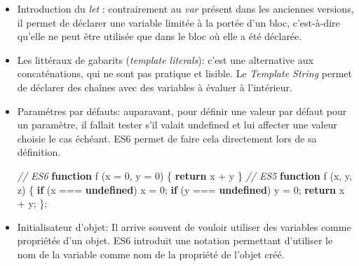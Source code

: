 \documentclass[12pt,a4paper]{article}
\newenvironment{Shaded}{}{}
\newcommand{\KeywordTok}[1]{\textcolor[rgb]{0.00,0.44,0.13}{\textbf{{#1}}}}
\newcommand{\DecValTok}[1]{\textcolor[rgb]{0.25,0.63,0.44}{{#1}}}
\newcommand{\SpecialCharTok}[1]{\textcolor[rgb]{0.25,0.44,0.63}{{#1}}}
\newcommand{\StringTok}[1]{\textcolor[rgb]{0.25,0.44,0.63}{{#1}}}
\newcommand{\VerbatimStringTok}[1]{\textcolor[rgb]{0.25,0.44,0.63}{{#1}}}
\newcommand{\CommentTok}[1]{\textcolor[rgb]{0.38,0.63,0.69}{\textit{{#1}}}}
\newcommand{\ControlFlowTok}[1]{\textcolor[rgb]{0.00,0.44,0.13}{\textbf{{#1}}}}
\newcommand{\OperatorTok}[1]{\textcolor[rgb]{0.40,0.40,0.40}{{#1}}}
\newcommand{\AttributeTok}[1]{\textcolor[rgb]{0.49,0.56,0.16}{{#1}}}
\newcommand{\NormalTok}[1]{{#1}}
\begin{document}
  \begin{itemize}
  \item
    Introduction du \emph{let} : contrairement au \emph{var} présent dans
    les anciennes versions, il permet de déclarer une variable limitée à
    la portée d'un bloc, c'est-à-dire qu'elle ne peut être utilisée que
    dans le bloc où elle a été déclarée.
  \item
    Les littéraux de gabarits (\emph{template literals}): c'est une
    alternative aux concaténations, qui ne sont pas pratique et lisible.
    Le \emph{Template String} permet de déclarer des chaînes avec des
    variables à évaluer à l'intérieur.

  \begin{Shaded}
  \end{Shaded}
  \item
    Paramétres par défauts: auparavant, pour définir une valeur par défaut
    pour un paramètre, il fallait tester s'il valait undefined et lui
    affecter une valeur choisie le cas échéant. ES6 permet de faire cela
    directement lors de sa définition.

  \begin{Shaded}
  \begin{Highlighting}[]
  \CommentTok{// ES6}
  \KeywordTok{function} \AttributeTok{f} \NormalTok{(x }\OperatorTok{=} \DecValTok{0}\OperatorTok{,} \NormalTok{y }\OperatorTok{=} \DecValTok{0}\NormalTok{) }\OperatorTok{\{}
      \ControlFlowTok{return} \NormalTok{x }\OperatorTok{+} \NormalTok{y}
  \OperatorTok{\}}
  \CommentTok{// ES5}
  \KeywordTok{function} \AttributeTok{f} \NormalTok{(x}\OperatorTok{,} \NormalTok{y}\OperatorTok{,} \NormalTok{z) }\OperatorTok{\{}
      \ControlFlowTok{if} \NormalTok{(x }\OperatorTok{===} \KeywordTok{undefined}\NormalTok{)}
          \NormalTok{x }\OperatorTok{=} \DecValTok{0}\OperatorTok{;}
      \ControlFlowTok{if} \NormalTok{(y }\OperatorTok{===} \KeywordTok{undefined}\NormalTok{)}
          \NormalTok{y }\OperatorTok{=} \DecValTok{0}\OperatorTok{;}
      \ControlFlowTok{return} \NormalTok{x }\OperatorTok{+} \NormalTok{y}\OperatorTok{;}
  \OperatorTok{\};}
  \end{Highlighting}
  \end{Shaded}
  \item
    Initialisateur d'objet: Il arrive souvent de vouloir utiliser des
    variables comme propriétés d'un objet. ES6 introduit une notation
    permettant d'utiliser le nom de la variable comme nom de la propriété
    de l'objet créé.


\end{itemize}
\end{document}
